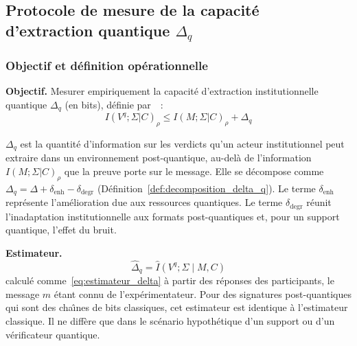 \subsection{Protocole de mesure de la capacit\'e d'extraction quantique $\Delta_q$}
\label{subsec:protocole_delta_q}
\begin{sloppypar}

\subsubsection{Objectif et d\'efinition op\'erationnelle}
\label{subsubsec:objectif_delta_q}

\noindent\textbf{Objectif.} Mesurer empiriquement la capacit\'e d'extraction
institutionnelle quantique $\Delta_q$ (en bits), d\'efinie
par~\cite{MINKA2026PQCRO}~:
\begin{equation}
I(V^q; \Sigma|C)_\rho \leq I(M;\Sigma|C)_\rho + \Delta_q
\label{eq:extraction_quantique_op}
\end{equation}

\begin{definition}\label{def:capacite_extraction_quantique_op}
$\Delta_q$ est la quantit\'e d'information sur les verdicts qu'un acteur
institutionnel peut extraire dans un environnement post-quantique,
au-del\`a de l'information $I(M;\Sigma|C)_\rho$ que la preuve porte sur le message. Elle se d\'ecompose
comme $\Delta_q = \Delta + \delta_{\mathrm{enh}} - \delta_{\mathrm{degr}}$
(D\'efinition~\ref{def:decomposition_delta_q}). Le terme $\delta_{\mathrm{enh}}$
repr\'esente l'am\'elioration due aux ressources quantiques. Le terme
$\delta_{\mathrm{degr}}$ r\'eunit l'inadaptation institutionnelle aux formats
post-quantiques et, pour un support quantique, l'effet du bruit.
\end{definition}

\noindent\textbf{Estimateur.}
\begin{equation}
\hat{\Delta}_q = \hat I(V^q;\Sigma \mid M, C)
\label{eq:estimateur_delta_q}
\end{equation}
calcul\'e comme~\eqref{eq:estimateur_delta} \`a partir des r\'eponses des
participants, le message $m$ \'etant connu de l'exp\'erimentateur. Pour des
signatures post-quantiques qui sont des cha\^{\i}nes de bits classiques, cet
estimateur est identique \`a l'estimateur classique. Il ne diff\`ere que dans le
sc\'enario hypoth\'etique d'un support ou d'un v\'erificateur quantique.


\end{sloppypar}
